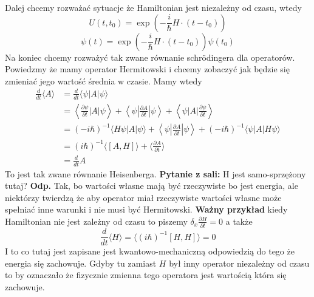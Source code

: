 Dalej chcemy rozważać sytuacje że Hamiltonian jest niezależny od czasu, wtedy $$  U\left(t, t_{0}\right)=\exp \left(-\frac{i}{\hbar} H \cdot(t-t_{0})\right)  $$
$$  \psi(t)=\exp \left(-\frac{i}{\hbar} H \cdot(t-t_{0})\right) \psi(t_0)  $$
Na koniec chcemy rozważyć tak zwane równanie schrödingera dla operatorów. Powiedzmy że mamy operator Hermitowski i chcemy zobaczyć jak będzie się zmieniać jego wartość średnia w czasie. Mamy wtedy 
\begin{equation*}
	\begin{split}
		\frac{d}{dt} \langle A \rangle &= \frac{d}{d t}\langle\psi| A|\psi\rangle \\
		&= \left\langle\frac{\partial \psi}{\partial t}\left|  A\right| \psi\right\rangle+\left\langle\psi| \frac{\partial A}{\partial t}| \psi\right\rangle+\left\langle\psi\left| A\right|\frac{\partial \psi}{\partial t}\right\rangle \\
		&= (-i \hbar)^{-1} \langle H\psi| A|\psi\rangle + \left\langle\psi| \frac{\partial A}{\partial t}| \psi\right\rangle + (-i \hbar)^{-1} \langle \psi| A|H\psi\rangle \\
		&= (i\hbar)^{-1} \langle [A, H] \rangle + \langle \frac{\partial A}{\partial t} \rangle \\
		&= \frac{d}{dt}A
	\end{split}
\end{equation*}
To jest tak zwane równanie Heisenberga. \textbf{Pytanie z sali:} H jest samo-sprzężony tutaj? \textbf{Odp.} Tak, bo wartości własne mają być rzeczywiste bo jest energia, ale niektórzy twierdzą że aby operator miał rzeczywiste wartości własne może spełniać inne warunki i nie musi być Hermitowski.
\textbf{Ważny przykład} kiedy Hamiltonian nie jest zależny od czasu to piszemy $\delta_x \frac{\partial H}{\partial t} = 0$ a także $$ \frac{d}{dt} \langle H \rangle =\langle (i \hbar)^{-1} [H, H] \rangle = 0$$
I to co tutaj jest zapisane jest kwantowo-mechaniczną odpowiedzią do tego że energia się zachowuje. Gdyby tu zamiast $H$ był inny operator niezależny od czasu to by oznaczało że fizycznie zmienna tego operatora jest wartością która się zachowuje.
